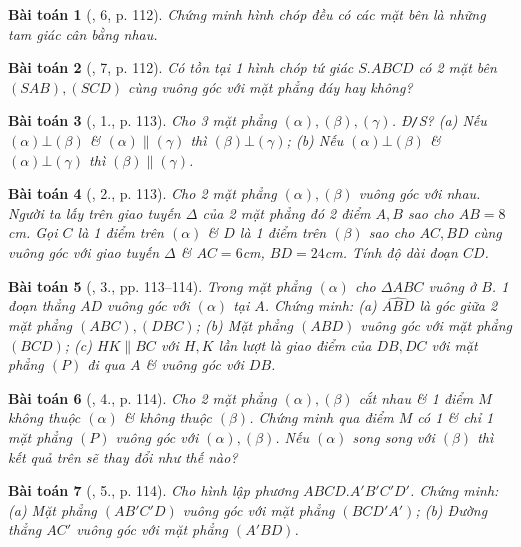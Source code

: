 \documentclass{article}
\numberwithin{equation}{section}
\newtheorem{baitoan}{Bài toán}
\begin{document}
\begin{baitoan}[\cite{SGK_Toan_11_hinh_hoc_co_ban}, 6, p. 112]
	Chứng minh hình chóp đều có các mặt bên là những tam giác cân bằng nhau.
\end{baitoan}

\begin{baitoan}[\cite{SGK_Toan_11_hinh_hoc_co_ban}, 7, p. 112]
	Có tồn tại 1 hình chóp tứ giác $S.ABCD$ có 2 mặt bên $(SAB),(SCD)$ cùng vuông góc với mặt phẳng đáy hay không?
\end{baitoan}

\begin{baitoan}[\cite{SGK_Toan_11_hinh_hoc_co_ban}, 1., p. 113]
	Cho 3 mặt phẳng $(\alpha),(\beta),(\gamma)$. \emph{Đ\texttt{/}S?} (a) Nếu $(\alpha)\bot(\beta)$ \& $(\alpha)\parallel(\gamma)$ thì $(\beta)\bot(\gamma)$; (b) Nếu $(\alpha)\bot(\beta)$ \& $(\alpha)\bot(\gamma)$ thì $(\beta)\parallel(\gamma)$.
\end{baitoan}

\begin{baitoan}[\cite{SGK_Toan_11_hinh_hoc_co_ban}, 2., p. 113]
	Cho 2 mặt phẳng $(\alpha),(\beta)$ vuông góc với nhau. Người ta lấy trên giao tuyến $\Delta$ của 2 mặt phẳng đó 2 điểm $A,B$ sao cho $AB = 8$\emph{cm}. Gọi $C$ là 1 điểm trên $(\alpha)$ \& $D$ là 1 điểm trên $(\beta)$ sao cho $AC,BD$ cùng vuông góc với giao tuyến $\Delta$ \& $AC = 6$\emph{cm}, $BD = 24$\emph{cm}. Tính độ dài đoạn $CD$.
\end{baitoan}

\begin{baitoan}[\cite{SGK_Toan_11_hinh_hoc_co_ban}, 3., pp. 113--114]
	Trong mặt phẳng $(\alpha)$ cho $\Delta ABC$ vuông ở $B$. 1 đoạn thẳng $AD$ vuông góc với $(\alpha)$ tại $A$. Chứng minh: (a) $\widehat{ABD}$ là góc giữa 2 mặt phẳng $(ABC),(DBC)$; (b) Mặt phẳng $(ABD)$ vuông góc với mặt phẳng $(BCD)$; (c) $HK\parallel BC$ với $H,K$ lần lượt là giao điểm của $DB,DC$ với mặt phẳng $(P)$ đi qua $A$ \& vuông góc với $DB$.
\end{baitoan}

\begin{baitoan}[\cite{SGK_Toan_11_hinh_hoc_co_ban}, 4., p. 114]
	Cho 2 mặt phẳng $(\alpha),(\beta)$ cắt nhau \& 1 điểm $M$ không thuộc $(\alpha)$ \& không thuộc $(\beta)$. Chứng minh qua điểm $M$ có 1 \& chỉ 1 mặt phẳng $(P)$ vuông góc với $(\alpha),(\beta)$. Nếu $(\alpha)$ song song với $(\beta)$ thì kết quả trên sẽ thay đổi như thế nào?
\end{baitoan}

\begin{baitoan}[\cite{SGK_Toan_11_hinh_hoc_co_ban}, 5., p. 114]
	Cho hình lập phương $ABCD.A'B'C'D'$. Chứng minh: (a) Mặt phẳng $(AB'C'D)$ vuông góc với mặt phẳng $(BCD'A')$; (b) Đường thẳng $AC'$ vuông góc với mặt phẳng $(A'BD)$.
\end{baitoan}
\end{document}
